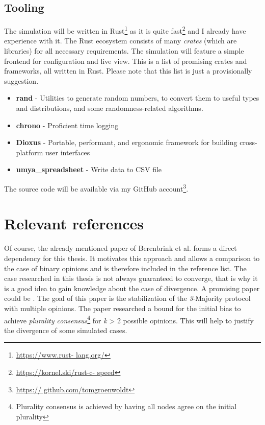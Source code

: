 \documentclass{thesis}
\begin{document}
\subsection{Tooling}
The simulation will be written in Rust\footnote{\url{https://www.rust-
lang.org/}} as it is quite fast\footnote{\url{https://kornel.ski/rust-c-
speed}} and I already have experience with it. The Rust ecosystem consists of
many \textit{crates} (which are libraries) for all necessary requirements. The
simulation will feature a simple frontend for configuration and live view.
\vspace{10pt}
\newline
This is a list of promising crates and frameworks, all written in Rust. Please
note that this list is just a provisionally suggestion.

\begin{itemize}
\item \textbf{rand} - Utilities to generate random numbers, to
convert them to useful types and distributions, and some randomness-related
algorithms.
\item \textbf{chrono} - Proficient time logging
\item \textbf{Dioxus} - Portable, performant, and ergonomic framework for
building cross-platform user interfaces
\item \textbf{umya\_spreadsheet} - Write data to CSV file
\end{itemize}

The source code will be available via my GitHub account\footnote{\url{https://
github.com/tomgroenwoldt}}.

\section{Relevant references}
Of course, the already mentioned paper of Berenbrink et al. \cite{1} forms
a direct dependency for this thesis. It motivates this approach and allows
a comparison to the case of binary opinions and is therefore included in the
reference list.
\newline
The case researched in this thesis is not always guaranteed to converge,
that is why it is a good idea to gain knowledge about the case of divergence. A
promising paper could be \cite{becchetti2015stabilizing}. The goal of this paper
is the stabilization of the \textit{3}-Majority protocol with multiple opinions.
\newline
The paper \cite{becchetti2015simple} researched a bound for the initial bias to
achieve \textit{plurality consensus}\footnote{Plurality consensus is achieved
by having all nodes agree on the initial plurality} for \textit{k} > 2 possible
opinions. This will help to justify the divergence of some simulated cases.
\printbibliography
\end{document}

